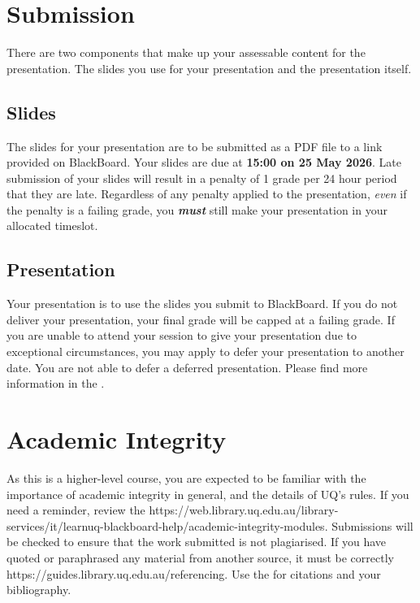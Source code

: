 \documentclass{csse4400}
\begin{document}
\section{Submission}

There are two components that make up your assessable content for the presentation.
The slides you use for your presentation and the presentation itself.

\subsection{Slides}
The slides for your presentation are to be submitted as a PDF file to a link provided on BlackBoard.
Your slides are due at \textbf{15:00 on 25 May 2026}.
Late submission of your slides will result in a penalty of 1 grade per 24 hour period that they are late.
Regardless of any penalty applied to the presentation, \emph{even} if the penalty is a failing grade,
you \textbf{\textit{must}} still make your presentation in your allocated timeslot.

\subsection{Presentation}
Your presentation is to use the slides you submit to BlackBoard.
If you do not deliver your presentation, your final grade will be capped at a failing grade.
If you are unable to attend your session to give your presentation due to exceptional circumstances,
you may apply to defer your presentation to another date.
You are not able to defer a deferred presentation.
Please find more information in the
.


\section{Academic Integrity}
As this is a higher-level course, you are expected to be familiar with the importance of academic integrity in general,
and the details of UQ's rules.
If you need a reminder, review the 
{https://web.library.uq.edu.au/library-services/it/learnuq-blackboard-help/academic-integrity-modules}.
Submissions will be checked to ensure that the work submitted is not plagiarised.
If you have quoted or paraphrased any material from another source, it must be correctly 
{https://guides.library.uq.edu.au/referencing}.
Use the  for citations and your bibliography.
\end{document}
